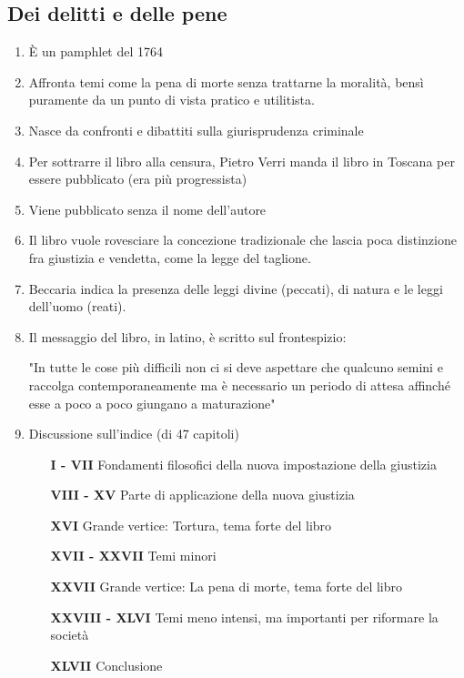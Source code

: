 \documentclass{article}
\begin{document}
\subsection{Dei delitti e delle pene}

\begin{enumerate}
    \item È un pamphlet del 1764
    \item Affronta temi come la pena di morte senza trattarne la moralità, bensì puramente da un punto di vista pratico e utilitista.
    \item Nasce da confronti e dibattiti sulla giurisprudenza criminale
    \item Per sottrarre il libro alla censura, Pietro Verri manda il libro in Toscana per essere pubblicato (era più progressista)
    \item Viene pubblicato senza il nome dell'autore
    \item Il libro vuole rovesciare la concezione tradizionale che lascia poca distinzione fra giustizia e vendetta, come la legge del taglione.
    \item Beccaria indica la presenza delle leggi divine (peccati), di natura e le leggi dell'uomo (reati).
    \item Il messaggio del libro, in latino, è scritto sul frontespizio:

    "In tutte le cose più difficili non ci si deve aspettare che qualcuno semini e 
    raccolga contemporaneamente ma è necessario un periodo di attesa affinché 
    esse a poco a poco giungano a maturazione"

    \item Discussione sull'indice (di 47 capitoli)
    \begin{itemize}
        \item[\textbf{I - VII}] Fondamenti filosofici della nuova impostazione della giustizia
        \item[\textbf{VIII - XV}] Parte di applicazione della nuova giustizia
        \item[\textbf{XVI}] Grande vertice: Tortura, tema forte del libro
        \item[\textbf{XVII - XXVII}] Temi minori
        \item[\textbf{XXVII}] Grande vertice: La pena di morte, tema forte del libro
        \item[\textbf{XXVIII - XLVI}] Temi meno intensi, ma importanti per riformare la società
        \item[\textbf{XLVII}] Conclusione
    \end{itemize}
\end{enumerate}
\end{document}
